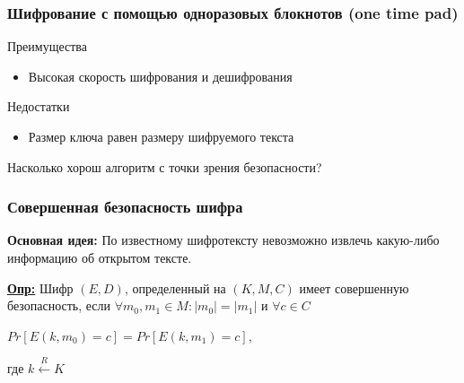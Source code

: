 \documentclass{beamer}
\newcommand{\longdef}[1]{{\textbf{\underline{Опр:}} #1}}
\begin{document}
\begin{frame}
  \frametitle{Шифрование с помощью одноразовых блокнотов (one time pad)}

  \begin{block} {Преимущества}
    \begin{itemize}
      \item{Высокая скорость шифрования и дешифрования}
    \end{itemize}
  \end{block}

  \begin{block} {Недостатки}
    \begin{itemize}
      \item{Размер ключа равен размеру шифруемого текста}
    \end{itemize}
  \end{block}

  \vspace{2 em}
  Насколько хорош алгоритм с точки зрения безопасности?

\end{frame}


\begin{frame}
  \frametitle{Совершенная безопасность шифра}

  \textbf{Основная идея:} По известному шифротексту невозможно извлечь какую-либо информацию об открытом тексте.
  \vspace{2em}

  \longdef{Шифр $(E,D)$, определенный на $(K,M,C)$ имеет совершенную безопасность, если \newline
    $\forall m_{0},m_{1} \in M:  |m_{0}| = |m_{1}|$ и $\forall c \in C$
      \begin{center} $Pr[E(k,m_{0}) = c] = Pr[E(k,m_{1}) = c]$, \end{center}
      где $k \stackrel{R}{\longleftarrow}K$}


\end{frame}
\end{document}

